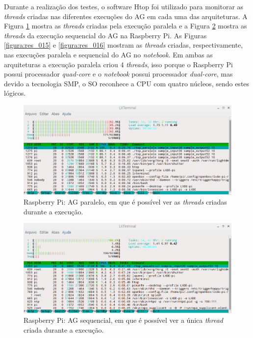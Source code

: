 Durante a realização dos testes, o software Htop foi utilizado para monitorar as \textit{threads} criadas nas diferentes execuções do AG em cada uma das arquiteturas. A Figura \ref{figura:res_013} mostra as \textit{threads} criadas pela execução paralela e a Figura \ref{figura:res_014} mostra as \textit{threads} da execução sequencial do AG na Raspberry Pi. As Figuras \ref{figura:res_015} e \ref{figura:res_016} mostram as \textit{threads} criadas, respectivamente, nas execuções paralela e sequencial do AG no \textit{notebook}.
Em ambas as arquiteturas a execução paralela criou 4 \textit{threads}, isso porque o Raspberry Pi possui processador \textit{quad-core} e o \textit{notebook} possui processador \textit{dual-core}, mas devido a tecnologia SMP, o SO reconhece a CPU com quatro núcleos, sendo estes lógicos.

\begin{figure}[htb]  
	\centering
	\includegraphics[width=.9\textwidth]{figuras/res_013}
	\caption[Raspberry Pi: AG paralelo]{Raspberry Pi: AG paralelo, em que é possível ver as \textit{threads} criadas durante a execução.}
	\label{figura:res_013}
\end{figure}

\begin{figure}[htb]  
	\centering
	\includegraphics[width=.9\textwidth]{figuras/res_014}
	\caption[Raspberry Pi: AG sequencial]{Raspberry Pi: AG sequencial, em que é possível ver a única \textit{thread} criada durante a execução.}
	\label{figura:res_014}
\end{figure}

